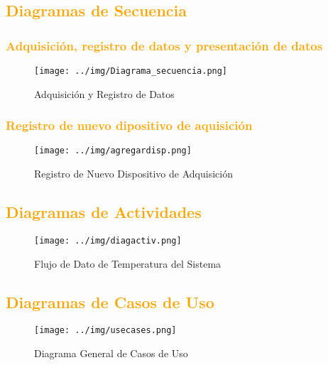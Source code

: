 \newpage
\subsection{\textcolor{orange}{Diagramas de Secuencia}}
\subsubsection{\textcolor{orange}{Adquisición, registro de datos y presentación de datos}}
\begin{figure}[h!]
 \begin{center}
  \texttt{[image: ../img/Diagrama\_secuencia.png]}
  \caption{Adquisición y Registro de Datos}
  \label{fig:esquema}
 \end{center}
\end{figure}
\subsubsection{\textcolor{orange}{Registro de nuevo dipositivo de aquisición}}
\begin{figure}[h!]
 \begin{center}
  \texttt{[image: ../img/agregardisp.png]}
  \caption{Registro de Nuevo Dispositivo de Adquisición}
  \label{fig:esquema}
 \end{center}
\end{figure}
\newpage
\subsection{\textcolor{orange}{Diagramas de Actividades}}
\begin{figure}[h!]
 \begin{center}
  \texttt{[image: ../img/diagactiv.png]}
 \caption{Flujo de Dato de Temperatura del Sistema}
  \label{fig:esquema}
 \end{center}
\end{figure}
\newpage
\subsection{\textcolor{orange}{Diagramas de Casos de Uso}}
\begin{figure}[h!]
 \begin{center}
  \texttt{[image: ../img/usecases.png]}
  \caption{Diagrama General de Casos de Uso}
  \label{fig:esquema}
 \end{center}
\end{figure}
